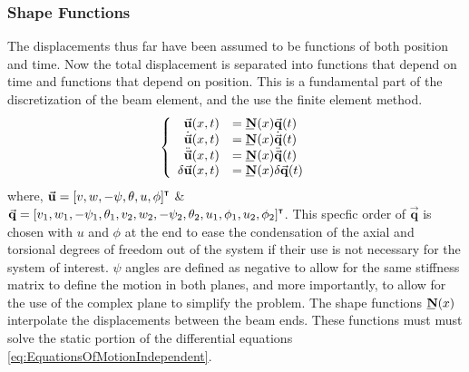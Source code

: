 \subsubsection{Shape Functions} \label{Shape Functions}
The displacements thus far have been assumed to be functions of both position and time. Now the total displacement is separated into functions that depend on time and functions that depend on position. This is a fundamental part of the discretization of the beam element, and the use the finite element method. 
\begin{equation} \label{eq:FEGoverning}
\left\{\begin{array}{rl}
\vec{\mathbf{u}}(x,t)&=\bunderline{\mathbf{N}}(x)\vec{\mathbf{q}}(t)\\
\dot{\vec{\mathbf{u}}}(x,t)&=\bunderline{\mathbf{N}}(x)\dot{\vec{\mathbf{q}}}(t)\\
\ddot{\vec{\mathbf{u}}}(x,t)&=\bunderline{\mathbf{N}}(x)\ddot{\vec{\mathbf{q}}}(t)\\
\delta\vec{\mathbf{u}}(x,t)&=\bunderline{\mathbf{N}}(x)\delta\vec{\mathbf{q}}(t)
\end{array}\right.
\end{equation}
where, $ \vec{\mathbf{u}}=[v,w,-\psi,\theta,u,\phi]^{\textbf{{\tiny \textsf{T}}}} $ \& $ \vec{\mathbf{q}}=[v_1,w_1,-\psi_1,\theta_1,v_2,w_2,-\psi_2,\theta_2,u_1,\phi_1,u_2,\phi_2]^{\textbf{{\tiny \textsf{T}}}} $. This specfic order of $ \vec{\mathbf{q}} $ is chosen with $ u $ and $ \phi $ at the end to ease the condensation of the axial and torsional degrees of freedom out of the system if their use is not necessary for the system of interest. $ \psi $ angles are defined as negative to allow for the same stiffness matrix to define the motion in both planes, and more importantly, to allow for the use of the complex plane to simplify the problem. The shape functions $ \bunderline{\mathbf{N}}(x) $ interpolate the displacements between the beam ends. These functions must must solve the static portion of the differential equations \eqref{eq:EquationsOfMotionIndependent}.
